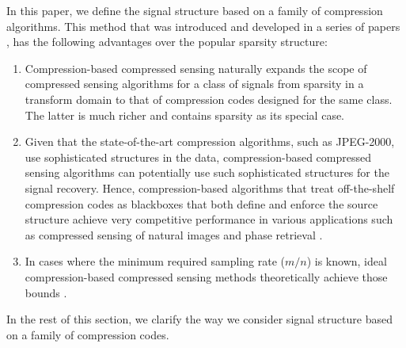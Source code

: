 \documentclass[onecolumn]{IEEEtran}
\begin{document}
In this paper, we define the signal structure based on a family of compression algorithms. This method that was introduced and developed in a series of papers \cite{jalali2016compression, beygi2019efficient, bakhshizadeh2020using, RezagahJ:17}, has the following advantages over the popular sparsity structure: 

\begin{enumerate}
\item Compression-based compressed sensing naturally expands the scope of compressed sensing algorithms for a class of signals from sparsity in a transform domain to that of compression codes designed for the same class. The latter is much richer and contains sparsity as its special case. 
\item  Given that the state-of-the-art compression algorithms, such as JPEG-2000, use sophisticated structures in the data, compression-based compressed sensing algorithms can potentially use such sophisticated structures for the signal recovery. Hence, compression-based algorithms that treat off-the-shelf compression codes as blackboxes that both define and enforce the source structure achieve very competitive performance in various applications such as compressed sensing of natural images \cite{beygi2019efficient} and phase retrieval \cite{bakhshizadeh2020using}.

\item In cases where the minimum required sampling rate ($m/n$) is known, ideal compression-based compressed sensing methods theoretically achieve those bounds \cite{RezagahJ:17}.

\end{enumerate}
In the rest of this section, we clarify the way we consider signal structure based on a family of compression codes. 
\end{document}
